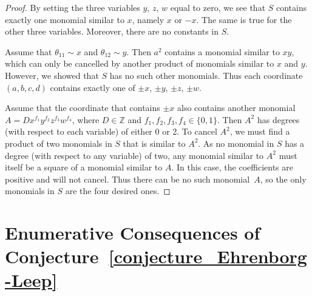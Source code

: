\documentclass[12pt,table]{article}
\theoremstyle{definition}
\theoremstyle{remark}
\newcommand{\Zzz}{\mathbb Z}
\numberwithin{equation}{section}
\begin{document}
\begin{proof}
By setting the three variables $y$, $z$, $w$ equal to zero, we see that $ S $ contains
exactly one monomial similar to $ x $, namely $ x$ or $ -x $. The same is true for
the other three variables. Moreover, there are no constants in $ S $.

Assume that $\theta_{11} \sim x$ and $\theta_{12} \sim y$.
Then $a^2$ contains
a monomial similar to $ xy $, which can only be cancelled by another product of monomials similar to
$ x $ and $y$. However, we showed that $ S $ has no such other monomials.
Thus each coordinate $ (a, b, c, d) $ contains exactly one of $ \pm x$, $\pm y$, $\pm z$, $\pm w $.


Assume that the coordinate that contains $ \pm x $ also contains
another monomial $ A = Dx^{f_1}y^{f_2}z^{f_3}w^{f_4}$, where $ D \in \Zzz $
and $ f_1,f_2,f_3,f_4 \in \{0,1\} $. Then $ A^2 $ has degrees (with respect to
each variable) of either 0 or 2. To cancel $ A^2 $, we must find a product of two
monomials in $ S $ that is similar to $ A^2 $. As no monomial in $ S $ has a degree
(with respect to any variable) of two, any monomial similar to $ A^2 $ must itself be
a square of a monomial similar to $ A $. In this case, the coefficients are
positive and will not cancel. Thus there can be no such monomial~$ A $, so the only monomials
in $ S $ are the four desired ones.
\end{proof}

\section{Enumerative Consequences of Conjecture~\ref{conjecture_Ehrenborg-Leep}} 
\end{document}
